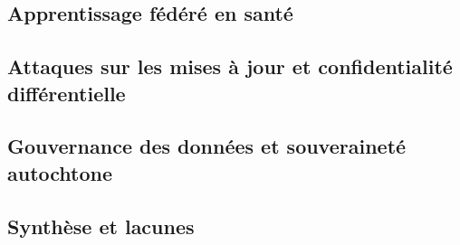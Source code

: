 
\subsection{Apprentissage fédéré en santé}
\label{sec:revue-fl-sante}

\subsection{Attaques sur les mises à jour et confidentialité différentielle}
\label{sec:revue-attaques-dp}

\subsection{Gouvernance des données et souveraineté autochtone}
\label{sec:revue-gouvernance}

\subsection{Synthèse et lacunes}
\label{sec:revue-synthese}
